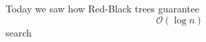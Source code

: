 \documentclass[preview]{standalone}
\begin{document}
\begin{center}
Today we saw how Red-Black trees guarantee {$$\mathcal{O} (\log n)$$} search
\end{center}
\end{document}
